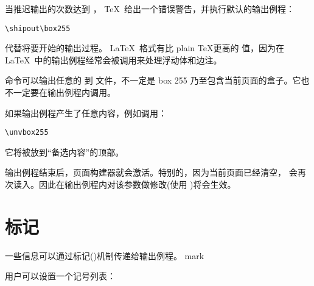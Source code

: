 \documentclass{book}
\begin{document}
当推迟输出的次数达到  ， \TeX\ 给出一个错误警告，并执行默认的输出例程：

\begin{verbatim}
\shipout\box255
\end{verbatim}

代替将要开始的输出过程。 \LaTeX\  格式有比 plain \TeX 更高的  值，因为在 \LaTeX\ 中的输出例程经常会被调用来处理浮动体和边注。



 命令可以输出任意的  到  文件，不一定是 box 255 乃至包含当前页面的盒子。它也不一定要在输出例程内调用。


如果输出例程产生了任意内容，例如调用：

\begin{verbatim}
\unvbox255
\end{verbatim}

它将被放到“备选内容”的顶部。


输出例程结束后，页面构建器就会激活。特别的，因为当前页面已经清空， 会再次读入。因此在输出例程内对该参数做修改(使用 )将会生效。


\section{标记}

一些信息可以通过标记()机制传递给输出例程。
\cstoidx mark\par
用户可以设置一个记号列表：
\end{document}
